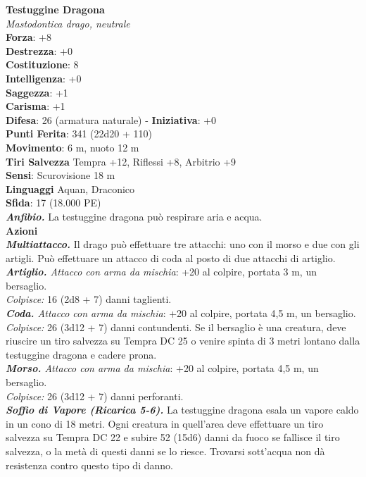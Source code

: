 \begin{multicols}{2}
\medskip\textbf{Testuggine Dragona}\\
\emph{Mastodontica drago, neutrale}\\
\textbf{Forza}: +8 \\
\textbf{Destrezza}: +0\\
\textbf{Costituzione}: 8\\
\textbf{Intelligenza}: +0\\
\textbf{Saggezza}: +1\\
\textbf{Carisma}: +1\\
\textbf{Difesa}: 26 (armatura naturale) - \textbf{Iniziativa}: +0\\
\textbf{Punti Ferita}: 341 (22d20 + 110)\\
\textbf{Movimento}: 6 m, nuoto 12 m\\
\textbf{Tiri Salvezza} Tempra +12, Riflessi +8, Arbitrio +9\\
\textbf{Sensi}: Scurovisione 18 m\\
\textbf{Linguaggi} Aquan, Draconico\\
\textbf{Sfida}: 17 (18.000 PE)\smallskip\\
\emph{\textbf{Anfibio.}} La testuggine dragona può respirare aria e acqua.\\
\smallskip\textbf{Azioni}\\
\emph{\textbf{Multiattacco.}} Il drago può effettuare tre attacchi: uno con il morso e due con gli artigli. Può effettuare un attacco di coda al posto di due attacchi di artiglio.\\
\emph{\textbf{Artiglio.} Attacco con arma da mischia}: +20 al colpire, portata 3 m, un bersaglio.\\
\emph{Colpisce:} 16 (2d8 + 7) danni taglienti. \\
\emph{\textbf{Coda.} Attacco con arma da mischia}: +20 al colpire, portata 4,5 m, un bersaglio.\\
\emph{Colpisce:} 26 (3d12 + 7) danni contundenti. Se il bersaglio è una creatura, deve riuscire un tiro salvezza su Tempra DC  25 o venire spinta di 3 metri lontano dalla testuggine dragona e cadere prona. \\
\emph{\textbf{Morso.} Attacco con arma da mischia}: +20 al colpire, portata 4,5 m, un bersaglio.\\
\emph{Colpisce:} 26 (3d12 + 7) danni perforanti. \\
\emph{\textbf{Soffio di Vapore (Ricarica 5-6).}} La testuggine dragona esala un vapore caldo in un cono di 18 metri. Ogni creatura in quell'area deve effettuare un tiro salvezza su Tempra DC  22 e subire 52 (15d6) danni da fuoco se fallisce il tiro salvezza, o la metà di questi danni se lo riesce. Trovarsi sott'acqua non dà resistenza contro questo tipo di danno.\\

\end{multicols}
